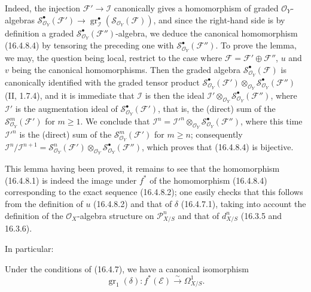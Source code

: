 Indeed, the injection $\mathscr{F}'\to\mathscr{I}$ canonically gives a
homomorphism of graded $\mathcal{O}_Y$-algebras\linebreak
$\mathscr{S}_{\mathcal{O}_Y}^{\bullet}(\mathscr{F}')\to\allowbreak
\operatorname{gr}_{\mathscr{I}}^\bullet
(\mathscr{S}_{\mathcal{O}_Y}(\mathscr{F}))$, and since the right-hand side is by
definition a graded $\mathscr{S}_{\mathcal{O}_Y}^{\bullet}(\mathscr{F}'')$-algebra,
we deduce the canonical homomorphism (16.4.8.4) by tensoring the preceding one
with $\mathscr{S}_{\mathcal{O}_Y}^{\bullet}(\mathscr{F}'')$. To
prove the lemma, we may, the question being local, restrict to the case where
$\mathscr{F}=\mathscr{F}'\oplus\mathscr{F}''$, $u$ and $v$ being the
canonical homomorphisms. Then the graded algebra
$\mathscr{S}_{\mathcal{O}_Y}^{\bullet}(\mathscr{F})$ is canonically identified
with the graded tensor product
$\mathscr{S}_{\mathcal{O}_Y}^{\bullet}(\mathscr{F}')
\otimes_{\mathcal{O}_Y}
\mathscr{S}_{\mathcal{O}_Y}^{\bullet}(\mathscr{F}'')$ (II, 1.7.4), and it is
immediate that $\mathscr{I}$ is then the ideal
$\mathscr{I}'\otimes_{\mathcal{O}_Y}
\mathscr{S}_{\mathcal{O}_Y}^{\bullet}(\mathscr{F}'')$, where $\mathscr{I}'$ is
the augmentation ideal of
$\mathscr{S}_{\mathcal{O}_Y}^{\bullet}(\mathscr{F}')$, that is, the
(direct) sum of the $\mathscr{S}_{\mathcal{O}_Y}^m(\mathscr{F}')$ for $m\geq1$.
We conclude that $\mathscr{I}^n=\mathscr{I}'^n\otimes_{\mathcal{O}_Y}
\mathscr{S}_{\mathcal{O}_Y}^{\bullet}(\mathscr{F}'')$, where this time
$\mathscr{I}'^n$ is the (direct) sum of the
$\mathscr{S}_{\mathcal{O}_Y}^m(\mathscr{F}')$ for $m\geq n$; consequently
$\mathscr{I}^n/\mathscr{I}^{n+1}=
\mathscr{S}_{\mathcal{O}_Y}^n(\mathscr{F}')\otimes_{\mathcal{O}_Y}
\mathscr{S}_{\mathcal{O}_Y}^{\bullet}(\mathscr{F}'')$, which proves that
(16.4.8.4) is bijective.

This lemma having been proved, it remains to see that the homomorphism
(16.4.8.1) is indeed the image under $f^*$ of the homomorphism (16.4.8.4)
corresponding to the exact sequence (16.4.8.2); one easily checks that this
follows from the definition of $u$ (16.4.8.2) and that of $\delta$ (16.4.7.1),
taking into account the definition of the $\mathcal{O}_X$-algebra structure on
$\mathscr{P}_{X/S}^n$ and that of $d_{X/S}^n$ (16.3.5 and 16.3.6).

In particular:

\begin{corollary}[16.4.9]
\label{IV.16.4.9}
Under the conditions of (16.4.7), we have a canonical isomorphism
\[
  \operatorname{gr}_1(\delta):f^*(\mathscr{E})
  \xrightarrow{\sim}\Omega_{X/S}^1.
  \tag{16.4.9.1}
  \label{IV.16.4.9.1}
\]
\end{corollary}

